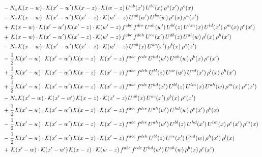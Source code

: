 \documentclass[9pt]{article}
\numberwithin{equation}{section}
\begin{document}
\begin{align}
& -N_{c}\,\mathcal{K}(x-w)\cdot\mathcal{K}(x'-w')\,\mathcal{K}(x-z)\cdot\mathcal{K}(w-z)\,U^{ab}(x')\,U^{bc}(x)\,\rho^{a}(x')\,\rho^{c}(x)\notag\\
& -N_{c}\,\mathcal{K}(x-w)\cdot\mathcal{K}(x'-w')\,\mathcal{K}(x'-z)\cdot\mathcal{K}(w'-z)\,U^{ab}(w')\,U^{bc}(w)\,\rho^{c}(x)\,\rho^{a}(x')\notag\\
& +\,\mathcal{K}(x-w)\cdot\mathcal{K}(x'-w')\,\mathcal{K}(x'-z)\cdot\mathcal{K}(w'-z)\,f^{abc}\,f^{dce}\,U^{ah}(w')\,U^{bl}(z)\,U^{hm}(x)\,U^{ld}(x')\,\rho^{m}(x)\,\rho^{e}(x')\notag\\
& +\,\mathcal{K}(x-w)\cdot\mathcal{K}(x'-w')\,\mathcal{K}(x'-z)\cdot\mathcal{K}(w'-z)\,f^{abc}\,f^{deh}\,U^{ce}(x')\,U^{db}(z)\,U^{al}(w)\,\rho^{l}(x)\,\rho^{h}(x')\notag\\
& -N_{c}\,\mathcal{K}(x-w)\cdot\mathcal{K}(x'-w')\,\mathcal{K}(x'-z)\cdot\mathcal{K}(w'-z)\,U^{ab}(x)\,U^{ac}(x')\,\rho^{b}(x)\,\rho^{c}(x')\notag\\
& -\frac{1}{2}\,\mathcal{K}(x'-w)\cdot\mathcal{K}(x'-w')\,\mathcal{K}(x-z)\cdot\mathcal{K}(x'-z)\,f^{abc}\,f^{cde}\,U^{hd}(w')\,U^{ah}(w)\,\rho^{b}(x)\,\rho^{e}(x')\notag\\
& +\frac{1}{2}\,\mathcal{K}(x'-w)\cdot\mathcal{K}(x'-w')\,\mathcal{K}(x-z)\cdot\mathcal{K}(x'-z)\,f^{abc}\,f^{deh}\,U^{bl}(z)\,U^{ae}(w')\,U^{cd}(x')\,\rho^{l}(x)\,\rho^{h}(x')\notag\\
& +\frac{1}{2}\,\mathcal{K}(x'-w)\cdot\mathcal{K}(x'-w')\,\mathcal{K}(x-z)\cdot\mathcal{K}(x'-z)\,f^{abc}\,f^{cde}\,U^{hd}(x')\,U^{bl}(z)\,U^{lm}(x)\,U^{ah}(w)\,\rho^{m}(x)\,\rho^{e}(x')\notag\\
& -N_{c}\,\mathcal{K}(x'-w)\cdot\mathcal{K}(x'-w')\,\mathcal{K}(x-z)\cdot\mathcal{K}(x'-z)\,U^{ab}(x)\,U^{ac}(x')\,\rho^{b}(x)\,\rho^{c}(x')\notag\\
& +\frac{1}{2}\,\mathcal{K}(x'-w)\cdot\mathcal{K}(x'-w')\,\mathcal{K}(x-z)\cdot\mathcal{K}(x'-z)\,f^{abc}\,f^{dce}\,U^{ah}(w')\,U^{hd}(w)\,\rho^{e}(x')\,\rho^{b}(x)\notag\\
& -\frac{1}{2}\,\mathcal{K}(x'-w)\cdot\mathcal{K}(x'-w')\,\mathcal{K}(x-z)\cdot\mathcal{K}(x'-z)\,f^{abc}\,f^{dce}\,U^{ah}(w')\,U^{bl}(z)\,U^{hd}(x')\,U^{lm}(x)\,\rho^{e}(x')\,\rho^{m}(x)\notag\\
& -\frac{1}{2}\,\mathcal{K}(x'-w)\cdot\mathcal{K}(x'-w')\,\mathcal{K}(x-z)\cdot\mathcal{K}(x'-z)\,f^{abc}\,f^{deh}\,U^{bl}(z)\,U^{ce}(x')\,U^{ad}(w)\,\rho^{h}(x')\,\rho^{l}(x)\notag\\
& +\,\mathcal{K}(x'-w)\cdot\mathcal{K}(x'-w')\,\mathcal{K}(x-z)\cdot\mathcal{K}(w-z)\,f^{abc}\,f^{cde}\,U^{hd}(w')\,U^{ah}(w)\,\rho^{b}(x)\,\rho^{e}(x')\notag\\

\end{align}
\end{document}
